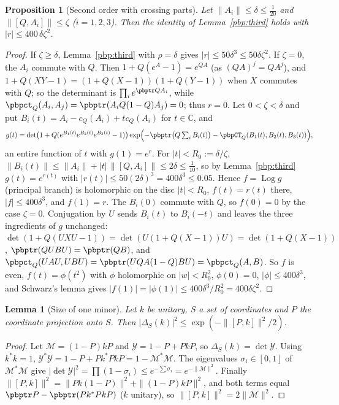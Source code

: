 \documentclass[10pt]{amsart}
\newtheorem{proposition}[theorem]{Proposition}
\newtheorem{lemma}[theorem]{Lemma}
\theoremstyle{definition}
\theoremstyle{remark}
\newcommand{\C}{\mathbb C}
\begin{document}
\begin{proposition}[Second order with crossing parts]\label{pbp:second}
Let $\|A_i\|\le\delta\le\frac1{20}$ and $\|[Q,A_i]\|\le\zeta$ \textup($i=1,2,3$\textup). Then the identity
of Lemma~\ref{pbp:third} holds with $|r|\le400\,\delta\zeta^2$.
\end{proposition}
\begin{proof}
If $\zeta\ge\delta$, Lemma~\ref{pbp:third} with $\rho=\delta$ gives $|r|\le50\delta^3\le50\delta\zeta^2$.
If $\zeta=0$, the $A_i$ commute with $Q$. Then $1+Q(e^{A}-1)=e^{QA}$ (as $(QA)^j=QA^j$), and
$1+Q(XY-1)=(1+Q(X-1))(1+Q(Y-1))$ when $X$ commutes with $Q$; so the determinant is
$\prod_ie^{\pbptr QA_i}$, while $\pbpct_Q(A_i,A_j)=\pbptr(A_iQ(1-Q)A_j)=0$; thus $r=0$.
Let $0<\zeta<\delta$ and put $B_i(t)=A_i-c_Q(A_i)+tc_Q(A_i)$ for $t\in\C$, and
\[
g(t)=\det\bigl(1+Q(e^{B_1(t)}e^{B_2(t)}e^{B_3(t)}-1)\bigr)\exp\Bigl(-\pbptr\bigl(Q\textstyle\sum_iB_i(t)
\bigr)-\pbpCT_Q(B_1(t),B_2(t),B_3(t))\Bigr),
\]
an entire function of $t$ with $g(1)=e^r$. For $|t|<R_0:=\delta/\zeta$, $\|B_i(t)\|\le\|A_i\|+|t|\,
\|[Q,A_i]\|\le2\delta\le\frac1{10}$, so by Lemma~\ref{pbp:third} $g(t)=e^{r(t)}$ with $|r(t)|\le
50(2\delta)^3=400\delta^3\le0.05$. Hence $f=\operatorname{Log}g$ (principal branch) is holomorphic on the
disc $|t|<R_0$, $f(t)=r(t)$ there, $|f|\le400\delta^3$, and $f(1)=r$. The $B_i(0)$ commute with $Q$, so
$f(0)=0$ by the case $\zeta=0$. Conjugation by $U$ sends $B_i(t)$ to $B_i(-t)$ and leaves the three
ingredients of $g$ unchanged: $\det(1+Q(UXU-1))=\det(U(1+Q(X-1))U)=\det(1+Q(X-1))$,
$\pbptr(QUBU)=\pbptr(QB)$, and $\pbpct_Q(UAU,UBU)=\pbptr(UQA(1-Q)BU)=\pbpct_Q(A,B)$. So $f$ is even,
$f(t)=\phi(t^2)$ with $\phi$ holomorphic on $|w|<R_0^2$, $\phi(0)=0$, $|\phi|\le400\delta^3$, and Schwarz's
lemma gives $|f(1)|=|\phi(1)|\le400\delta^3/R_0^2=400\delta\zeta^2$.
\end{proof}

\begin{lemma}[Size of one minor]\label{pbp:minorsize}
Let $k$ be unitary, $S$ a set of coordinates and $P$ the coordinate projection onto $S$. Then
$|\Delta_S(k)|^2\le\exp(-\|[P,k]\|^2/2)$.
\end{lemma}
\begin{proof}
Let $\mathcal M=(1-P)kP$ and $\mathcal Y=1-P+PkP$, so $\Delta_S(k)=\det\mathcal Y$. Using $k^*k=1$,
$\mathcal Y^*\mathcal Y=1-P+Pk^*PkP=1-\mathcal M^*\mathcal M$. The eigenvalues $\sigma_i\in[0,1]$ of
$\mathcal M^*\mathcal M$ give $|\det\mathcal Y|^2=\prod(1-\sigma_i)\le e^{-\sum\sigma_i}=e^{-\|\mathcal
M\|^2}$. Finally $\|[P,k]\|^2=\|Pk(1-P)\|^2+\|(1-P)kP\|^2$, and both terms equal $\pbptr P-
\pbptr(Pk^*PkP)$ ($k$ unitary), so $\|[P,k]\|^2=2\|\mathcal M\|^2$.
\end{proof}
\end{document}

